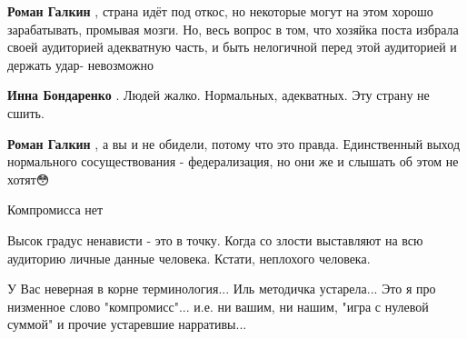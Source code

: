\begin{itemize}
\begin{itemize}
\textbf{Роман Галкин} , страна идёт под откос, но некоторые могут на этом
хорошо зарабатывать, промывая мозги. Но, весь вопрос в том, что хозяйка поста
избрала своей аудиторией адекватную часть, и быть нелогичной перед этой
аудиторией и держать удар- невозможно

 
\textbf{Инна Бондаренко} . Людей жалко. Нормальных, адекватных. Эту страну не сшить.

 
\textbf{Роман Галкин} , а вы и не обидели, потому что это правда. Единственный выход нормального сосуществования - федерализация, но они же и слышать об этом не хотят😳
\end{itemize}

 
Компромисса нет

 
Высок градус ненависти - это в точку. Когда со злости выставляют на всю
аудиторию личные данные человека. Кстати, неплохого человека.


 

У Вас неверная в корне терминология... Иль методичка устарела... Это я про
низменное слово "компромисс"... и.е. ни вашим, ни нашим, "игра с нулевой
суммой" и прочие устаревшие нарративы...

\end{itemize}

